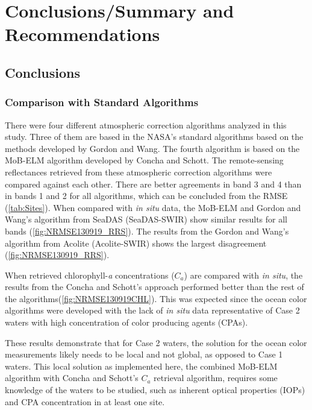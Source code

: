 \chapter{Conclusions/Summary and Recommendations}
\section{Conclusions}

\label{sec:conc}  %

\subsection{Comparison with Standard Algorithms}
There were four different atmospheric correction algorithms analyzed in this study. Three of them are based in the NASA's standard algorithms based on the methods developed by Gordon and Wang\cite{Gordon:1994}. The fourth algorithm is based on the MoB-ELM algorithm developed by Concha and Schott\cite{Concha2014SPIE}. The remote-sensing reflectances retrieved from these atmospheric correction algorithms were compared against each other. There are better agreements in band 3 and 4 than in bands 1 and 2 for all algorithms, which can be concluded from the RMSE (\autoref{tab:Sites}). When compared with {\it in situ} data, the MoB-ELM and Gordon and Wang's algorithm from SeaDAS (SeaDAS-SWIR) show similar results for all bands (\autoref{fig:NRMSE130919_RRS}). The results from the Gordon and Wang's algorithm from Acolite (Acolite-SWIR) shows the largest disagreement (\autoref{fig:NRMSE130919_RRS}).

When retrieved chlorophyll-{\it a} concentrations ($C_a$) are compared with {\it in situ}, the results from the Concha and Schott's approach performed better than the rest of the algorithms(\autoref{fig:NRMSE130919CHL}). This was expected since the ocean color algorithms were developed with the lack of {\it in situ} data representative of Case 2 waters with high concentration of color producing agents (CPAs).

These results demonstrate that for Case 2 waters, the solution for the ocean color measurements likely needs to be local and not global, as opposed to Case 1 waters. This local solution as implemented here, the combined MoB-ELM algorithm with Concha and Schott's $C_a$ retrieval algorithm, requires some knowledge of the waters to be studied, such as inherent optical properties (IOPs) and CPA concentration in at least one site.

